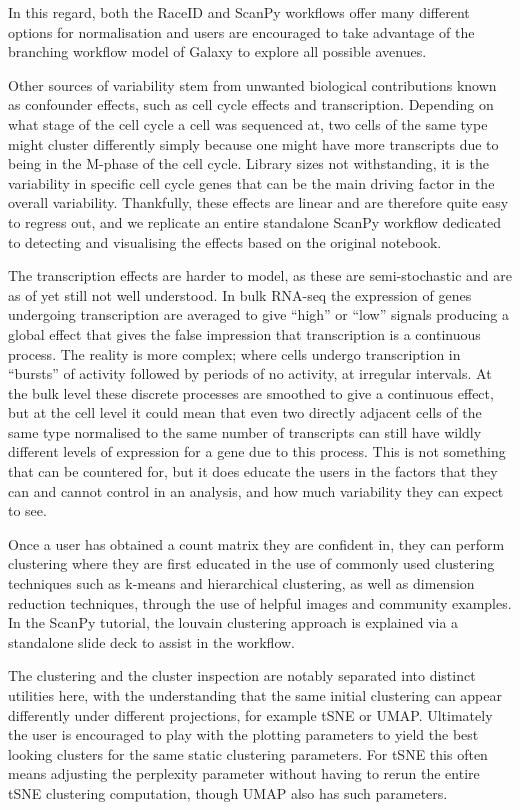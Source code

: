 \documentclass[a4paper,num-refs]{oup-contemporary}
\begin{document}
In this regard, both the RaceID and ScanPy workflows offer many different options for normalisation and users are encouraged to take advantage of the branching workflow model of Galaxy to explore all possible avenues.

Other sources of variability stem from unwanted biological contributions known as confounder effects, such as cell cycle effects and transcription. Depending on what stage of the cell cycle a cell was sequenced at, two cells of the same type might cluster differently simply because one might have more transcripts due to being in the M-phase of the cell cycle. Library sizes not withstanding, it is the variability in specific cell cycle genes that can be the main driving factor in the overall variability. Thankfully, these effects are linear and are therefore quite easy to regress out, and we replicate an entire standalone ScanPy workflow dedicated to detecting and visualising the effects based on the original notebook.

The transcription effects are harder to model, as these are semi-stochastic and are as of yet still not well understood. In bulk RNA-seq the expression of genes undergoing transcription are averaged to give ``high'' or ``low'' signals producing a global effect that gives the false impression that transcription is a continuous process. The reality is more complex; where cells undergo transcription in ``bursts'' of activity followed by periods of no activity, at irregular intervals. At the bulk level these discrete processes are smoothed to give a continuous effect, but at the cell level it could mean that even two directly adjacent cells of the same type normalised to the same number of transcripts can still have wildly different levels of expression for a gene due to this process. This is not something that can be countered for, but it does educate the users in the factors that they can and cannot control in an analysis, and how much variability they can expect to see.

Once a user has obtained a count matrix they are confident in, they can perform clustering where they are first educated in the use of commonly used clustering techniques such as k-means and hierarchical clustering, as well as dimension reduction techniques, through the use of helpful images and community examples.
In the ScanPy tutorial, the louvain clustering approach is explained via a standalone slide deck to assist in the workflow.

The clustering and the cluster inspection are notably separated into distinct utilities here, with the understanding that the same initial clustering can appear differently under different projections, for example tSNE or UMAP. Ultimately the user is encouraged to play with the plotting parameters to yield the best looking clusters for the same static clustering parameters. For tSNE this often means adjusting the perplexity parameter without having to rerun the entire tSNE clustering computation, though UMAP also has such parameters.
\end{document}
